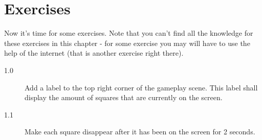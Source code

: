\section{Exercises}
Now it's time for some exercises. Note that you can't find all the knowledge
for these exercises in this chapter - for some exercise you may will have to use
the help of the internet (that is another exercise right there).
\begin{description}
\item[1.0] Add a label to the top right corner of the gameplay scene. This label
shall display the amount of squares that are currently on the screen.
\item[1.1] Make each square disappear after it has been on the screen for 2
seconds. 
\end{description}
